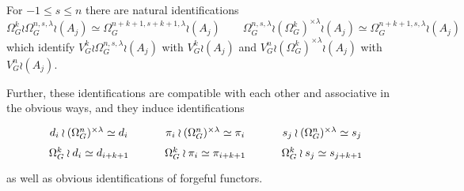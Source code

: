\documentclass[a4paper,10pt]{article}%
\begin{document}
\begin{corollary}\label{LABIDEN COR}
For $-1 \leq s \leq n$ there are natural identifications
\[
	\Omega_G^{k} \wr \Omega_G^{n,s,\lambda} \wr (A_j) \simeq
	\Omega_G^{n+k+1,s+k+1,\lambda} \wr (A_j)
\qquad
	\Omega_G^{n,s,\lambda} \wr 
	(\Omega_G^k)^{\times \lambda}
	\wr (A_j)
\simeq
	\Omega_G^{n+k+1,s,\lambda} \wr (A_j)
\]
which identify 
$V^k_G \wr \Omega_G^{n,s,\lambda} \wr (A_j) $ with 
$V^k_G \wr (A_j) $
and 
$V_G^n \wr (\Omega_G^k)^{\times \lambda}\wr (A_j) $
with 
$V_G^n \wr (A_j)$.

Further, these identifications are compatible with each other and associative in the obvious ways, and they induce identifications
\[
\begin{tikzcd}[row sep =0]
	d_i \wr (\Omega_G^{n})^{\times \lambda} \simeq d_i 
&
	\pi_i \wr (\Omega_G^{n})^{\times \lambda} \simeq \pi_i 
&
	s_j \wr (\Omega_G^{n})^{\times \lambda} \simeq s_j 
\\
	\Omega_G^k \wr d_i \simeq d_{i+k+1} 
&
	\Omega_G^k \wr \pi_i \simeq \pi_{i+k+1} 
&
	\Omega_G^k \wr s_j \simeq s_{j+k+1}
\end{tikzcd}
\]
as well as obvious identifications of forgeful functors.
\end{corollary}
\end{document}
